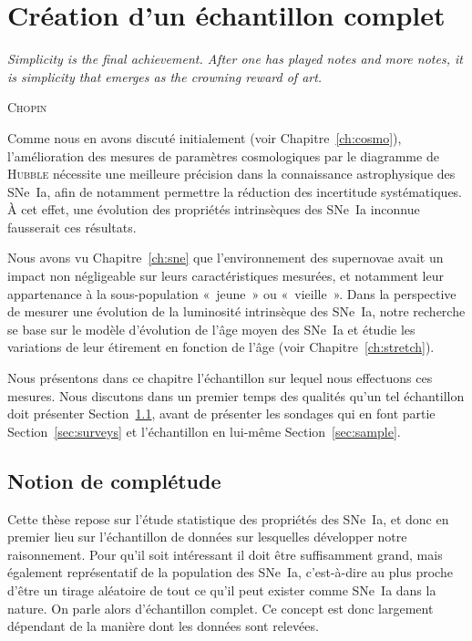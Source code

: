 \documentclass[../main/main.tex]{subfiles}
\begin{document}
\dominitoc
\faketableofcontents
\dominilof
\fakelistoffigures
\dominilot
\fakelistoftables

\chapter{Cr\'eation d'un \'echantillon complet}\label{ch:sample}

\epigraph{\openquote\textit{Simplicity is the final achievement. After one has
        played notes and more notes, it is simplicity that emerges as the
crowning reward of art.}\closequote}{\textsc{Chopin}}

Comme nous en avons discuté initialement (voir Chapitre~\ref{ch:cosmo}),
l'amélioration des mesures de paramètres cosmologiques par le diagramme de
\textsc{Hubble} nécessite une meilleure précision dans la connaissance
astrophysique des SNe~Ia, afin de notamment permettre la réduction des
incertitude systématiques. À cet effet, une évolution des propriétés
intrinsèques des SNe~Ia inconnue fausserait ces résultats.

Nous avons vu Chapitre~\ref{ch:sne} que l'environnement des supernovae avait un
impact non négligeable sur leurs caractéristiques mesurées, et notamment leur
appartenance à la sous-population «~jeune~» ou «~vieille~». Dans la perspective
de mesurer une évolution de la luminosité intrinsèque des SNe~Ia, notre
recherche se base sur le modèle d'évolution de l'âge moyen des SNe~Ia et étudie
les variations de leur étirement en fonction de l'âge (voir
Chapitre~\ref{ch:stretch}).

Nous présentons dans ce chapitre l'échantillon sur lequel nous effectuons ces
mesures. Nous discutons dans un premier temps des qualités qu'un tel échantillon
doit présenter Section~\ref{sec:compl}, avant de présenter les sondages qui en
font partie Section~\ref{sec:surveys} et l'échantillon en lui-même
Section~\ref{sec:sample}.

\vfill
\minitoc
\vfill
\newpage

\section{Notion de complétude}\label{sec:compl}


Cette thèse repose sur l'étude statistique des propriétés des SNe~Ia, et  donc
en premier lieu sur l'échantillon de données sur lesquelles développer notre
raisonnement. Pour qu'il soit intéressant il doit être suffisamment grand, mais
également représentatif de la population des SNe~Ia, c'est-à-dire au plus proche
d'être un tirage aléatoire de tout ce qu'il peut exister comme SNe~Ia dans la
nature. On parle alors d'échantillon complet. Ce concept est donc largement
dépendant de la manière dont les données sont relevées.
\end{document}
